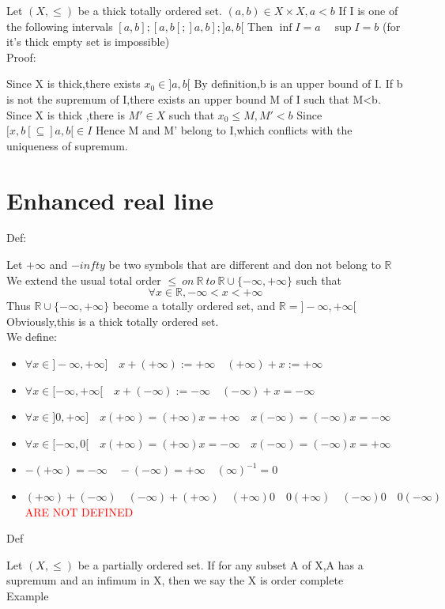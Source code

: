 \documentclass{book}
\begin{document}
Let $(X,\leq)$ be a thick totally ordered set. $(a,b)\in X\times X,a<b$ If I is one of the following intervals $[a,b];[a,b[;]a,b];]a,b[$ Then $\inf I=a\quad \sup I=b$ (for it's thick empty set is impossible)\\
Proof:

Since X is thick,there exists $x_0\in]a,b[$ By definition,b is an upper bound of I. If b is not the supremum of I,there exists an upper bound M of I such that M<b. Since X is thick ,there is $M'\in X$ such that $x_0\leq M,M'<b$ Since $[x,b[\subseteq]a,b[\in I$ Hence M and M' belong to I,which conflicts with the uniqueness of supremum.
\chapter{Enhanced real line}
Def:

Let $+\infty$ and $-infty$ be two symbols that are different and don not belong to $\mathbb{R}$ We extend the usual total order $\leq\ on\ \mathbb{R}\ to\ \mathbb{R}\cup\{-\infty,+\infty\}$ such that $$\forall x\in \mathbb{R} ,-\infty<x<+\infty$$ 
\indent Thus $\mathbb{R} \cup\{-\infty,+\infty\}$ become a totally ordered set, and $\mathbb{R} =]-\infty,+\infty[$  Obviously,this is a thick totally ordered set.\\
We define:
\begin{itemize}
    \item $\forall x\in ]-\infty,+\infty]\quad x+(+\infty):=+\infty \quad (+\infty)+x:=+\infty$
    \item $\forall x\in [-\infty,+\infty[\quad x+(-\infty):=-\infty\quad (-\infty)+x=-\infty$
    \item $\forall x\in ]0,+\infty]\quad x(+\infty)=(+\infty)x=+\infty\quad x(-\infty)=(-\infty)x=-\infty$
    \item $\forall x\in [-\infty,0[\quad x(+\infty)=(+\infty)x=-\infty\quad x(-\infty)=(-\infty)x=+\infty$
    \item $-(+\infty)=-\infty\quad -(-\infty)=+\infty\quad (\infty)^{-1}=0$
    \item $(+\infty)+(-\infty)\quad (-\infty)+(+\infty)\quad (+\infty)0\quad 0(+\infty)\quad(-\infty)0\quad 0(-\infty)$ \\\textcolor{red}{ARE NOT DEFINED}
\end{itemize}
Def 

Let $(X,\leq)$ be a partially ordered set. If for any subset A of X,A has a supremum and an infimum in X, then we say the X is order complete\\
Example
\end{document}
